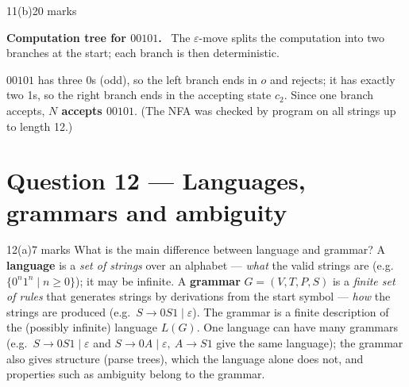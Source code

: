 \documentclass[10.5pt,a4paper]{article}
\newcommand{\ansh}[1]{\textbf{\color{exborder}#1}\ }
\newcommand{\eps}{\varepsilon}
\begin{document}
\begin{qa}{11(b)}{20 marks}
\begin{center}
\end{center}
\ansh{Computation tree for $00101$.} The $\eps$-move splits the computation into two branches at the start; each branch is then deterministic.
\begin{center}
\end{center}
$00101$ has three 0s (odd), so the left branch ends in $o$ and rejects; it has exactly two 1s, so the right branch ends in the accepting state
$c_2$. Since one branch accepts, \textbf{$N$ accepts $00101$}. (The NFA was checked by program on all strings up to length 12.)
\end{qa}

\section{Question 12 --- Languages, grammars and ambiguity}
\begin{qa}{12(a)}{7 marks}
What is the main difference between language and grammar?
\tcblower
A \textbf{language} is a \emph{set of strings} over an alphabet --- \emph{what} the valid strings are (e.g.\ $\{0^n1^n\mid n\ge0\}$); it may be infinite.
A \textbf{grammar} $G=(V,T,P,S)$ is a \emph{finite set of rules} that generates strings by derivations from the start symbol --- \emph{how} the strings
are produced (e.g.\ $S\to0S1\mid\eps$). The grammar is a finite description of the (possibly infinite) language $L(G)$. One language can have many
grammars (e.g.\ $S\to0S1\mid\eps$ and $S\to0A\mid\eps,\ A\to S1$ give the same language); the grammar also gives structure (parse trees), which the
language alone does not, and properties such as ambiguity belong to the grammar.
\end{qa}
\end{document}
